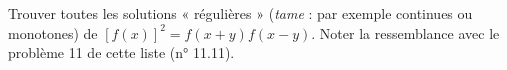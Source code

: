 Trouver toutes les solutions « régulières » (\emph{tame} : par exemple continues ou monotones) de $[f(x)]^2 = f(x + y)f(x - y)$. Noter la ressemblance avec le problème 11 de cette liste (n° 11.11).
